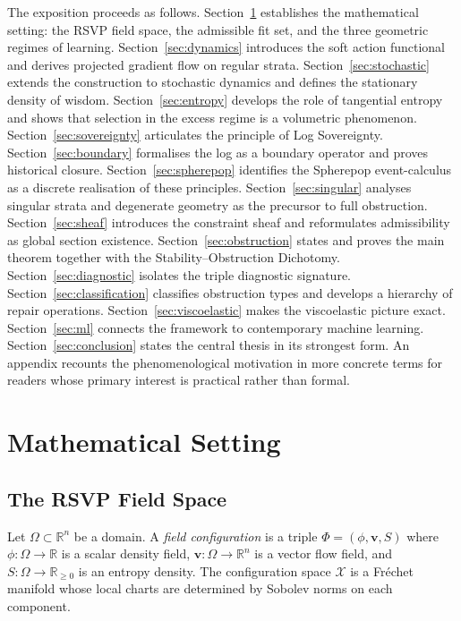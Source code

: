 \documentclass[12pt,oneside]{article}
\theoremstyle{plain}
\theoremstyle{definition}
\theoremstyle{remark}
\newcommand{\X}{\mathcal{X}}
\begin{document}
The exposition proceeds as follows. Section~\ref{sec:setting} establishes the
mathematical setting: the RSVP field space, the admissible fit set, and the
three geometric regimes of learning. Section~\ref{sec:dynamics} introduces the
soft action functional and derives projected gradient flow on regular strata.
Section~\ref{sec:stochastic} extends the construction to stochastic dynamics and
defines the stationary density of wisdom. Section~\ref{sec:entropy} develops the
role of tangential entropy and shows that selection in the excess regime is a
volumetric phenomenon. Section~\ref{sec:sovereignty} articulates the principle of
Log Sovereignty. Section~\ref{sec:boundary} formalises the log as a boundary
operator and proves historical closure. Section~\ref{sec:spherepop} identifies
the Spherepop event-calculus as a discrete realisation of these principles.
Section~\ref{sec:singular} analyses singular strata and degenerate geometry as
the precursor to full obstruction. Section~\ref{sec:sheaf} introduces the
constraint sheaf and reformulates admissibility as global section existence.
Section~\ref{sec:obstruction} states and proves the main theorem together with
the Stability--Obstruction Dichotomy. Section~\ref{sec:diagnostic} isolates the
triple diagnostic signature. Section~\ref{sec:classification} classifies
obstruction types and develops a hierarchy of repair operations.
Section~\ref{sec:viscoelastic} makes the viscoelastic picture exact.
Section~\ref{sec:ml} connects the framework to contemporary machine learning.
Section~\ref{sec:conclusion} states the central thesis in its strongest form.
An appendix recounts the phenomenological motivation in more concrete terms for
readers whose primary interest is practical rather than formal.

\section{Mathematical Setting}
\label{sec:setting}

\subsection{The RSVP Field Space}

Let $\Omega \subset \mathbb{R}^n$ be a domain. A \emph{field configuration} is
a triple $\Phi = (\phi, \mathbf{v}, S)$ where $\phi : \Omega \to \mathbb{R}$ is
a scalar density field, $\mathbf{v} : \Omega \to \mathbb{R}^n$ is a vector flow
field, and $S : \Omega \to \mathbb{R}_{\geq 0}$ is an entropy density.
The configuration space $\X$ is a Fr\'echet manifold whose local charts are
determined by Sobolev norms on each component.
\end{document}
